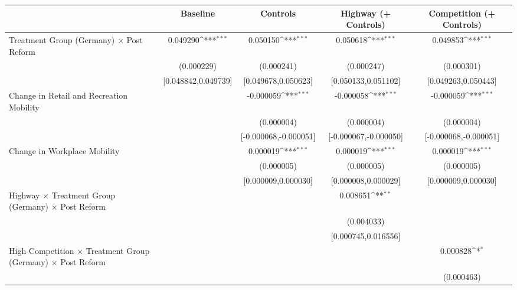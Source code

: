 {
\def\sym#1{\ifmmode^{#1}\else\(^{#1}\)\fi}
\begin{tabular}{l*{4}{c}}
\toprule
                    &\multicolumn{1}{c}{Baseline}&\multicolumn{1}{c}{Controls}&\multicolumn{1}{c}{Highway (+ Controls)}&\multicolumn{1}{c}{Competition (+ Controls)}\\
\midrule
Treatment Group (Germany) $\times$ Post Reform&    0.049290\sym{***}&    0.050150\sym{***}&    0.050618\sym{***}&    0.049853\sym{***}\\
                    &  (0.000229)         &  (0.000241)         &  (0.000247)         &  (0.000301)         \\
                    &[0.048842,0.049739]         &[0.049678,0.050623]         &[0.050133,0.051102]         &[0.049263,0.050443]         \\
Change in Retail and Recreation Mobility&                     &   -0.000059\sym{***}&   -0.000058\sym{***}&   -0.000059\sym{***}\\
                    &                     &  (0.000004)         &  (0.000004)         &  (0.000004)         \\
                    &                     &[-0.000068,-0.000051]         &[-0.000067,-0.000050]         &[-0.000068,-0.000051]         \\
Change in Workplace Mobility&                     &    0.000019\sym{***}&    0.000019\sym{***}&    0.000019\sym{***}\\
                    &                     &  (0.000005)         &  (0.000005)         &  (0.000005)         \\
                    &                     &[0.000009,0.000030]         &[0.000008,0.000029]         &[0.000009,0.000030]         \\
Highway $\times$ Treatment Group (Germany) $\times$ Post Reform&                     &                     &    0.008651\sym{**} &                     \\
                    &                     &                     &  (0.004033)         &                     \\
                    &                     &                     &[0.000745,0.016556]         &                     \\
High Competition $\times$ Treatment Group (Germany) $\times$ Post Reform&                     &                     &                     &    0.000828\sym{*}  \\
                    &                     &                     &                     &  (0.000463)         \\

\end{tabular}}
